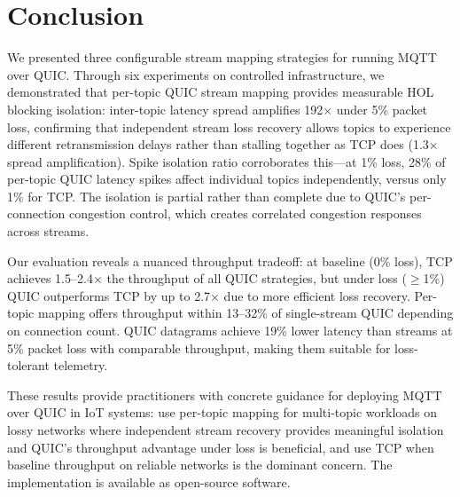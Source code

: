 \section{Conclusion}
\label{sec:conclusion}

We presented three configurable stream mapping strategies for running MQTT over QUIC. Through six experiments on controlled infrastructure, we demonstrated that per-topic QUIC stream mapping provides measurable HOL blocking isolation: inter-topic latency spread amplifies 192$\times$ under 5\% packet loss, confirming that independent stream loss recovery allows topics to experience different retransmission delays rather than stalling together as TCP does (1.3$\times$ spread amplification). Spike isolation ratio corroborates this---at 1\% loss, 28\% of per-topic QUIC latency spikes affect individual topics independently, versus only 1\% for TCP. The isolation is partial rather than complete due to QUIC's per-connection congestion control, which creates correlated congestion responses across streams.

Our evaluation reveals a nuanced throughput tradeoff: at baseline (0\% loss), TCP achieves 1.5--2.4$\times$ the throughput of all QUIC strategies, but under loss ($\geq$1\%) QUIC outperforms TCP by up to 2.7$\times$ due to more efficient loss recovery. Per-topic mapping offers throughput within 13--32\% of single-stream QUIC depending on connection count. QUIC datagrams achieve 19\% lower latency than streams at 5\% packet loss with comparable throughput, making them suitable for loss-tolerant telemetry.

These results provide practitioners with concrete guidance for deploying MQTT over QUIC in IoT systems: use per-topic mapping for multi-topic workloads on lossy networks where independent stream recovery provides meaningful isolation and QUIC's throughput advantage under loss is beneficial, and use TCP when baseline throughput on reliable networks is the dominant concern. The implementation is available as open-source software.
